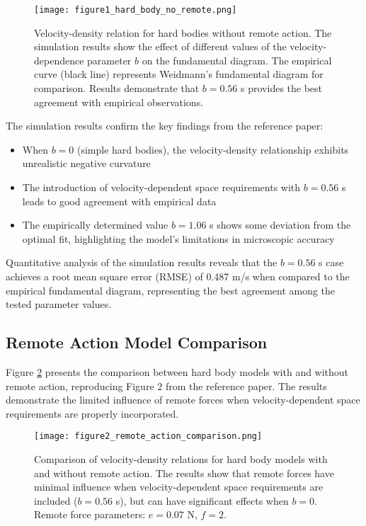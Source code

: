 \documentclass[12pt,a4paper]{article}
\begin{document}
\begin{figure}[H]
\centering
\texttt{[image: figure1\_hard\_body\_no\_remote.png]}
\caption{Velocity-density relation for hard bodies without remote action. The simulation results show the effect of different values of the velocity-dependence parameter $b$ on the fundamental diagram. The empirical curve (black line) represents Weidmann's fundamental diagram for comparison. Results demonstrate that $b = 0.56$ s provides the best agreement with empirical observations.}
\label{fig:hard_body_no_remote}
\end{figure}

The simulation results confirm the key findings from the reference paper:

\begin{itemize}
\item When $b = 0$ (simple hard bodies), the velocity-density relationship exhibits unrealistic negative curvature
\item The introduction of velocity-dependent space requirements with $b = 0.56$ s leads to good agreement with empirical data
\item The empirically determined value $b = 1.06$ s shows some deviation from the optimal fit, highlighting the model's limitations in microscopic accuracy
\end{itemize}

Quantitative analysis of the simulation results reveals that the $b = 0.56$ s case achieves a root mean square error (RMSE) of 0.487 m/s when compared to the empirical fundamental diagram, representing the best agreement among the tested parameter values.

\subsection{Remote Action Model Comparison}

Figure \ref{fig:remote_action_comparison} presents the comparison between hard body models with and without remote action, reproducing Figure 2 from the reference paper. The results demonstrate the limited influence of remote forces when velocity-dependent space requirements are properly incorporated.

\begin{figure}[H]
\centering
\texttt{[image: figure2\_remote\_action\_comparison.png]}
\caption{Comparison of velocity-density relations for hard body models with and without remote action. The results show that remote forces have minimal influence when velocity-dependent space requirements are included ($b = 0.56$ s), but can have significant effects when $b = 0$. Remote force parameters: $e = 0.07$ N, $f = 2$.}
\label{fig:remote_action_comparison}
\end{figure}
\end{document}
